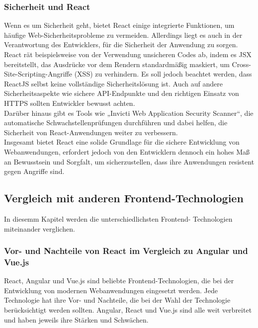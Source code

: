 \subsubsection{Sicherheit und React}
Wenn es um Sicherheit geht, bietet React einige integrierte Funktionen, um häufige Web-Sicherheitsprobleme zu vermeiden. Allerdings liegt es  auch in der Verantwortung des Entwicklers, für die Sicherheit der Anwendung zu sorgen.\\

React rät beispielsweise von der Verwendung unsicheren Codes ab, indem es JSX bereitstellt, das  Ausdrücke vor dem Rendern standardmäßig maskiert, um Cross-Site-Scripting-Angriffe (XSS)  zu verhindern. Es soll jedoch beachtet werden, dass ReactJS selbst keine vollständige Sicherheitslösung ist. Auch auf andere Sicherheitsaspekte wie sichere API-Endpunkte und den richtigen Einsatz von HTTPS sollten Entwickler bewusst achten.\\

Darüber hinaus gibt es Tools wie „Invicti Web Application Security Scanner“, die  automatische Schwachstellenprüfungen durchführen und dabei helfen, die Sicherheit von React-Anwendungen weiter zu verbessern\cite{geekflare_learning_resources}\cite{geekflare_rendering}.\\

Insgesamt bietet React  eine solide Grundlage für die sichere Entwicklung von Webanwendungen,  erfordert jedoch von den Entwicklern dennoch ein hohes Maß an Bewusstsein und Sorgfalt, um sicherzustellen, dass ihre Anwendungen resistent gegen Angriffe sind.\\

\subsection{Vergleich mit anderen Frontend-Technologien}
In diesemm Kapitel werden die unterschiedlichsten Frontend- Technologien miteinander verglichen.
\subsubsection{Vor- und Nachteile von React im Vergleich zu Angular und Vue.js}
React, Angular und Vue.js sind beliebte Frontend-Technologien, die bei der Entwicklung von modernen Webanwendungen eingesetzt werden. Jede Technologie hat ihre Vor- und Nachteile, die bei der Wahl der Technologie berücksichtigt werden sollten.
Angular, React und Vue.js sind alle weit verbreitet und haben jeweils ihre Stärken und Schwächen.\\

